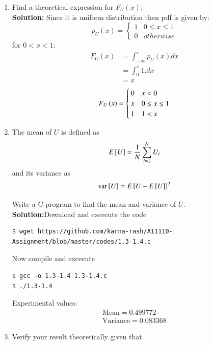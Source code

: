 \documentclass[journal,12pt,twocolumn]{IEEEtran}
\renewcommand\thesection{\arabic{section}}
\begin{document}
\begin{enumerate}[label=\thesection.\arabic*
,ref=\thesection.\theenumi]
%
\item
Find a  theoretical expression for $F_{U}(x)$.\\
\textbf{Solution:} 
	Since it is uniform distribution then pdf is given by:
	\begin{equation}
		p_U(x)=
		\begin{cases}
        1 & 0 \le x\le 1 \\
	    0 & otherwise
		\end{cases}
	\end{equation}
	for $0<x<1 :$
	\begin{align}
		F_U(x) & = \int_{-\infty}^{x}p_U(x)dx  \\
		       & = \int_{0}^{x}1.dx \\
			   & = x
	\end{align}
	\begin{equation}
	F_U\left(x\right)=\begin{cases}
	 0 & x<0 \\
	 x & 0\le x \le 1 \\
	 1 &1<x
\end{cases}	
	\end{equation}
	
\item
The mean of $U$ is defined as
%
\begin{equation}
E{}\left[U\right] = \frac{1}{N}\sum_{i=1}^{N}U_i
\end{equation}
%
and its variance as
%
\begin{equation}
\text{var}{}\left[U\right] = E{}\left[U- E{}\left[U\right]\right]^2 
\end{equation}

Write a C program to  find the mean and variance of $U$. \\
\textbf{Solution:}Download and excecute the code
\begin{lstlisting}
$ wget https://github.com/karna-rash/A11110-Assignment/blob/master/codes/1.3-1.4.c
\end{lstlisting}
Now compile and excecute
\begin{lstlisting}
$ gcc -o 1.3-1.4 1.3-1.4.c
$ ./1.3-1.4
\end{lstlisting}
Experimental values:
\begin{align}
\text{Mean} = 0.499772 \label{1.9}\\
\text{Variance}= 0.083368 \label{1.10}
\end{align}
\item Verify your result theoretically given that
\end{enumerate}
\end{document}
